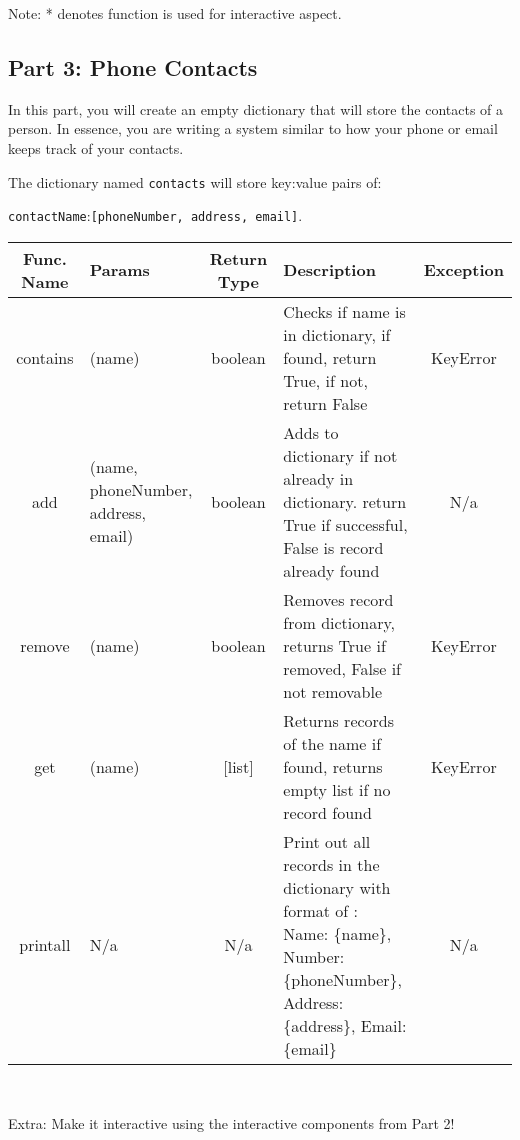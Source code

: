 \documentclass[12pt]{report}
\begin{document}
${}$

Note: * denotes function is used for interactive aspect.

\newpage

\subsection*{Part 3: Phone Contacts}
In this part, you will create an empty dictionary that will store the contacts of a person. 
In essence, you are writing a system similar to how your phone or email keeps track of your contacts.

The dictionary named \lstinline[language=Python]{contacts} will store key:value pairs of: 

\lstinline[language=Python]{contactName}:\lstinline[language=Python]{[phoneNumber, address, email]}.

\begin{tabular}{| c | L | c | L | c |}
    \hline
    Func. Name & Params & Return Type & Description & Exception \\
    \hline
    contains & (name) & boolean & Checks if name is in dictionary, if found, return True, if not, return False & KeyError \\
    \hline
    add & (name, phoneNumber, address, email) & boolean & Adds to dictionary if not already in dictionary. return True if successful, False is record already found & N/a \\
    \hline
    remove & (name) & boolean & Removes record from dictionary, returns True if removed, False if not removable & KeyError \\
    \hline
    get & (name) & [list] & Returns records of the name if found, returns empty list if no record found & KeyError \\
    \hline
    printall & N/a & N/a & Print out all records in the dictionary with format of : \newline Name: \{name\}, Number: \{phoneNumber\}, Address: \{address\}, Email: \{email\} & N/a\\ 
    \hline
\end{tabular}\\

${}$

Extra: Make it interactive using the interactive components from Part 2!

\newpage
\end{document}
